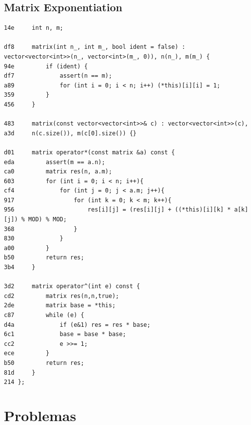 \documentclass[11pt, a4paper, twoside]{article}
\begin{document}
\subsection{Matrix Exponentiation}
\begin{lstlisting}
14e     int n, m;

df8     matrix(int n_, int m_, bool ident = false) : vector<vector<int>>(n_, vector<int>(m_, 0)), n(n_), m(m_) {
94e         if (ident) {
df7             assert(n == m);
a89 			for (int i = 0; i < n; i++) (*this)[i][i] = 1;
359 		}
456 	}

483     matrix(const vector<vector<int>>& c) : vector<vector<int>>(c),
a3d     n(c.size()), m(c[0].size()) {}

d01     matrix operator*(const matrix &a) const {
eda         assert(m == a.n);
ca0         matrix res(n, a.m);
603         for (int i = 0; i < n; i++){
cf4             for (int j = 0; j < a.m; j++){
917                 for (int k = 0; k < m; k++){
956                     res[i][j] = (res[i][j] + ((*this)[i][k] * a[k][j]) % MOD) % MOD;
368                 }
830             }
a00         }
b50         return res;
3b4     }

3d2     matrix operator^(int e) const {
cd2         matrix res(n,n,true);
2de         matrix base = *this;
c87         while (e) {
d4a             if (e&1) res = res * base;
6c1             base = base * base;
cc2             e >>= 1;
ece         }
b50         return res;
81d     }
214 };
\end{lstlisting}



%
%

\section{Problemas}
\end{document}
